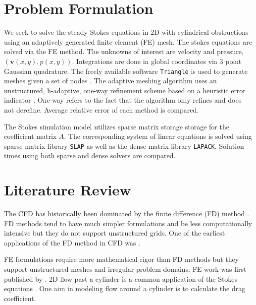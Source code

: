 \documentclass[wrr]{agutex}  %
\begin{document}
\begin{article}
\section{Problem Formulation}
We seek to solve the steady Stokes equations in 2D with cylindrical obstructions using an adaptively generated finite element (FE) mesh.  The stokes equations are solved via the FE method.  The unknowns of interest are velocity and pressure, $(\mathbf{v}(x,y),p(x,y))$.  Integrations are done in global coordinates via 3 point Gaussian quadrature.  The freely available software {\tt Triangle} is used to generate meshes given a set of nodes \citep{Shewchuk1996}.  The adaptive meshing algorithm uses an unstructured, h-adaptive, one-way refinement scheme based on a heuristic error indicator \citep{Bangerth2003}.  One-way refers to the fact that the algorithm only refines and does not derefine.  Average relative error of each method is compared.

The Stokes simulation model utilizes sparse matrix storage storage for the coefficient matrix $A$.  The corresponding system of linear equations is solved using sparse matrix library {\tt SLAP} \citep{Anderson1999} as well as the dense matrix library {\tt LAPACK}.  Solution times using both sparse and dense solvers are compared.  
 
\section{Literature Review}
 
The CFD has historically been dominated by the finite difference (FD) method \citep{Chung2002}.  FD methods tend to have much simpler formulations and be less computationally intensive but they do not support unstructured grids.  One of the earliest applications of the FD method in CFD was \cite{Courant1928}.  

FE formulations require more mathematical rigor than FD methods but they support unstructured meshes and irregular problem domains.  FE work was first published by \cite{Turner1956}.  2D flow past a cylinder is a common application of the Stokes equations \citep{Bangerth2003}.  One aim in modeling flow around a cylinder is to calculate the drag coefficient. 


\end{article}
\end{document}
